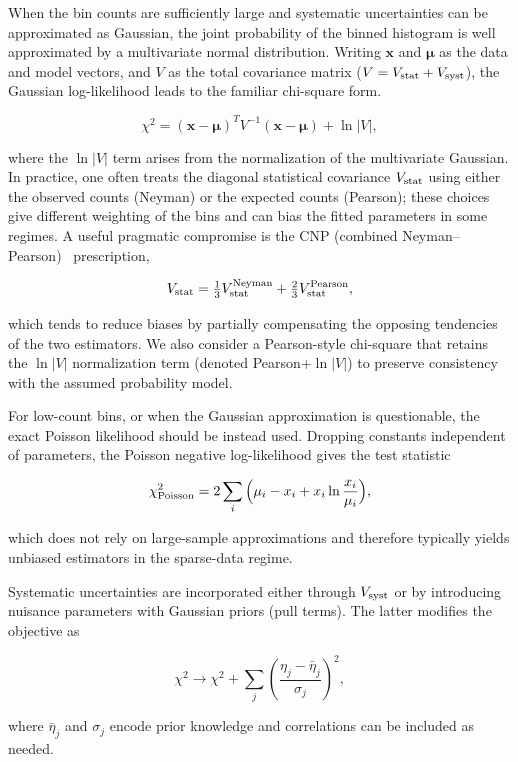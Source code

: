 \documentclass[a4paper,11pt]{article}
\begin{document}
When the bin counts are sufficiently large and systematic uncertainties can be approximated as Gaussian, the joint probability of the binned histogram is well approximated by a multivariate normal distribution. Writing $\mathbf{x}$ and $\boldsymbol{\mu}$ as the data and model vectors, and $V$ as the total covariance matrix ($V=V_{\rm stat}+V_{\rm syst}$), the Gaussian log-likelihood leads to the familiar chi-square form.

$$\chi^2 = (\mathbf{x}-\boldsymbol{\mu})^{T} V^{-1} (\mathbf{x}-\boldsymbol{\mu}) + \ln|V|,$$

where the $\ln|V|$ term arises from the normalization of the multivariate Gaussian. In practice, one often treats the diagonal statistical covariance $V_{\rm stat}$ using either the observed counts (Neyman) or the expected counts (Pearson); these choices give different weighting of the bins and can bias the fitted parameters in some regimes. A useful pragmatic compromise is the CNP (combined Neyman–Pearson)~\cite{Ji2019CombinedNC} prescription,

$$V_{\rm stat}=\tfrac{1}{3}V_{\rm stat}^{\rm Neyman}+\tfrac{2}{3}V_{\rm stat}^{\rm Pearson},$$

which tends to reduce biases by partially compensating the opposing tendencies of the two estimators. We also consider a Pearson-style chi-square that retains the $\ln|V|$ normalization term (denoted Pearson+$\ln|V|$) to preserve consistency with the assumed probability model.

For low-count bins, or when the Gaussian approximation is questionable, the exact Poisson likelihood should be instead used. Dropping constants independent of parameters, the Poisson negative log-likelihood gives the test statistic

$$\chi^2_{\rm Poisson}=2\sum_i\Big(\mu_i - x_i + x_i\ln\frac{x_i}{\mu_i}\Big),$$

which does not rely on large-sample approximations and therefore typically yields unbiased estimators in the sparse-data regime.

Systematic uncertainties are incorporated either through $V_{\rm syst}$ or by introducing nuisance parameters with Gaussian priors (pull terms). The latter modifies the objective as

$$\chi^2 \to \chi^2 + \sum_j\left(\frac{\eta_j-\bar\eta_j}{\sigma_j}\right)^2,$$

where $\bar\eta_j$ and $\sigma_j$ encode prior knowledge and correlations can be included as needed.
\end{document}
